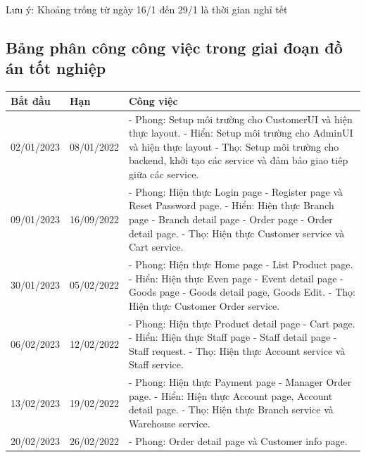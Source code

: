 Lưu ý: Khoảng trống từ ngày 16/1 đến 29/1 là thời gian nghỉ tết

\newpage
\subsection{Bảng phân công công việc trong giai đoạn đồ án tốt nghiệp}
{
\setlength\extrarowheight{6pt}
\begin{longtable}{| p{2cm} | p{2cm} | p{10cm} |}

	\hline
	\textbf{Bắt đầu} & \textbf{Hạn} & \textbf{Công việc} \\
	\hline
	02/01/2023 & 08/01/2022 & 
    - Phong: Setup môi trường cho CustomerUI và hiện thực layout. 
    \newline
    - Hiển: Setup môi trường cho AdminUI và hiện thực layout 
    \newline
    - Thọ: Setup môi trường cho backend, khởi tạo các service và đảm bảo giao tiêp giữa các service. \\
	\hline
	09/01/2023 & 16/09/2022 & 
    - Phong: Hiện thực Login page - Register page và Reset Password page. 
    \newline
    - Hiển: Hiện thực Branch page - Branch detail page - Order page - Order detail page. 
    \newline
    - Thọ: Hiện thực Customer service và Cart service. \\
	\hline
	30/01/2023 & 05/02/2022 & 
    - Phong: Hiện thực Home page - List Product page. 
    \newline
    - Hiển: Hiện thực Even page - Event detail page - Goods page - Goods detail page, Goods Edit. 
    \newline
    - Thọ: Hiện thực Customer Order service. \\
	\hline
	06/02/2023 & 12/02/2022 & 
    - Phong: Hiện thực Product detail page - Cart page. 
    \newline
    - Hiển: Hiện thực Staff page - Staff detail page - Staff request. 
    \newline
    - Thọ: Hiện thực Account service và Staff service. \\
	\hline
	13/02/2023 & 19/02/2022 & 
    - Phong: Hiện thực Payment page - Manager Order page. 
    \newline
    - Hiển: Hiện thực Account page, Account detail page. 
    \newline
    - Thọ: Hiện thực Branch service và Warehouse service. \\
	\hline
	20/02/2023 & 26/02/2022 & 
    - Phong: Order detail page và Customer info page. 

\end{longtable}}
